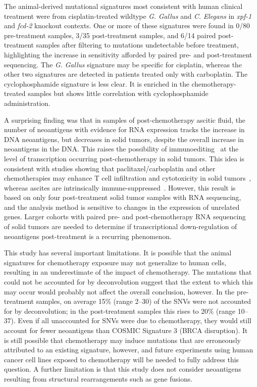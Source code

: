 The animal-derived mutational signatures most consistent with human clinical treatment were from cisplatin-treated wildtype \textit{G. Gallus} and \textit{C. Elegans} in \textit{xpf-1} and \textit{fcd-2} knockout contexts. One or more of these signatures were found in 0/80 pre-treatment samples, 3/35 post-treatment samples, and 6/14 paired post-treatment samples after filtering to mutations undetectable before treatment, highlighting the increase in sensitivity afforded by paired pre- and post-treatment sequencing. The \textit{G. Gallus} signature may be specific for cisplatin, whereas the other two signatures are detected in patients treated only with carboplatin. The cyclophosphamide signature is less clear. It is enriched in the chemotherapy-treated samples but shows little correlation with cyclophosphamide administration.

A surprising finding was that in samples of post-chemotherapy ascitic fluid, the number of neoantigens with evidence for RNA expression tracks the increase in DNA neoantigens, but decreases in solid tumors, despite the overall increase in neoantigens in the DNA. This raises the possibility of immunoediting~\cite{Dunn_2002} at the level of transcription occurring post-chemotherapy in solid tumors. This idea is consistent with studies showing that paclitaxel/carboplatin and other chemotherapies may enhance T cell infiltration and cytotoxicity in solid tumors~\cite{Demaria2001,Wu_2009,Pfannenstiel_2010,Hodge_2013}, whereas ascites are intrinsically immune-suppressed~\cite{Giuntoli2009,Simpson-Abelson2013,Singel2016}. However, this result is based on only four post-treatment solid tumor samples with RNA sequencing, and the analysis method is sensitive to changes in the expression of unrelated genes. Larger cohorts with paired pre- and post-chemotherapy RNA sequencing of solid tumors are needed to determine if transcriptional down-regulation of neoantigens post-treatment is a recurring phenomenon.

This study has several important limitations. It is possible that the animal signatures for chemotherapy exposure may not generalize to human cells, resulting in an underestimate of the impact of chemotherapy. The mutations that could not be accounted for by deconvolution suggest that the extent to which this may occur would probably not affect the overall conclusion, however. In the pre-treatment samples, on average 15\% (range 2--30) of the SNVs were not accounted for by deconvolution; in the post-treatment samples this rises to 20\% (range 10--37). Even if all unaccounted for SNVs were due to chemotherapy, they would still account for fewer neoantigens than COSMIC Signature 3 (BRCA disruption). It is still possible that chemotherapy may induce mutations that are erroneously attributed to an existing signature, however, and future experiments using human cancer cell lines exposed to chemotherapy will be needed to fully address this question. A further limitation is that this study does not consider neoantigens resulting from structural rearrangements such as gene fusions.

